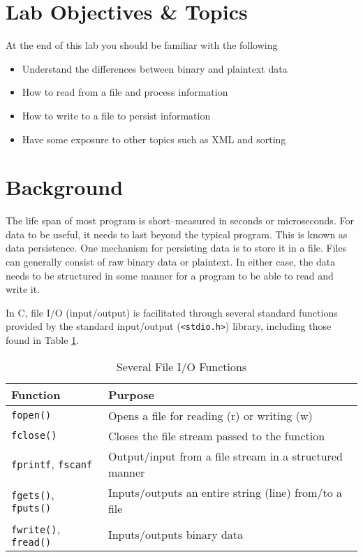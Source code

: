 \documentclass[12pt]{scrartcl}
\begin{document}
\section{Lab Objectives \& Topics}
At the end of this lab you should be familiar with the following
\begin{itemize}
  \item Understand the differences between binary and plaintext data
  \item How to read from a file and process information
  \item How to write to a file to persist information
  \item Have some exposure to other topics such as XML and sorting
\end{itemize}

\section{Background}

The life span of most program is short--measured in seconds or 
microseconds.  For data to be useful, it needs to last beyond the 
typical program.  This is known as data persistence.  One mechanism 
for persisting data is to store it in a file.  Files can generally consist 
of raw binary data or plaintext.  In either case, the data needs to be 
structured in some manner for a program to be able to read and write 
it.

In C, file I/O (input/output) is facilitated through several standard 
functions provided by the standard input/output (\texttt{<stdio.h>})
library, including those found in Table \ref{table:functions}.

\begin{table}
\centering
\begin{tabular}{l|l}
Function & Purpose \\
\hline\hline
\texttt{fopen()} & Opens a file for reading (r) or writing (w) \\
\texttt{fclose()} & Closes the file stream passed to the function \\
\texttt{fprintf}, \texttt{fscanf} & Output/input from a file stream in a structured manner \\
\texttt{fgets()}, \texttt{fputs()} & Inputs/outputs an entire string (line) from/to a file \\
\texttt{fwrite()}, \texttt{fread()} & Inputs/outputs binary data \\
\end{tabular}
\caption{Several File I/O Functions}
\label{table:functions}
\end{table}
\end{document}
